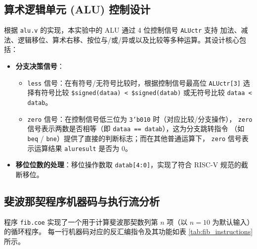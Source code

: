\documentclass[12pt, a4paper]{ctexart}
\begin{document}
\subsection{算术逻辑单元 (ALU) 控制设计}

根据 \texttt{alu.v} 的实现，本实验中的 ALU 通过 4 位控制信号 \texttt{ALUctr} 支持
加法、减法、逻辑移位、算术右移、按位与/或/异或以及比较等多种运算。其设计核心包括：

\begin{itemize}
    \item \textbf{分支决策信号}：
    \begin{itemize}
        \item \texttt{less} 信号：在有符号/无符号比较时，根据控制信号最高位 \texttt{ALUctr[3]}
        选择有符号比较 \texttt{\$signed(dataa) < \$signed(datab)} 或无符号比较 \texttt{dataa < datab}。
        \item \texttt{zero} 信号：在控制信号低三位为 \texttt{3'b010} 时（对应比较/分支操作），
        \texttt{zero} 信号表示两数是否相等（即 \texttt{dataa == datab}），这为分支跳转指令
        （如 \texttt{beq} / \texttt{bne}）提供了直接的判断标志；而在其他普通运算下，
        \texttt{zero} 信号表示运算结果 \texttt{aluresult} 是否为 0。
    \end{itemize}
    \item \textbf{移位位数的处理}：移位操作数取 \texttt{datab[4:0]}，实现了符合 RISC-V 规范的截断移位。
\end{itemize}

\subsection{斐波那契程序机器码与执行流分析}

程序 \texttt{fib.coe} 实现了一个用于计算斐波那契数列第 $n$ 项（以 $n=10$ 为默认输入）的循环程序。
每一行机器码对应的反汇编指令及其功能如表 \ref{tab:fib_instructions} 所示。
\end{document}

